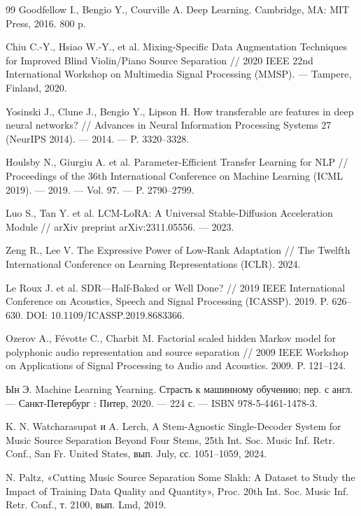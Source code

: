 \documentclass[14pt]{extarticle}
\begin{document}
\begin{thebibliography}{99}
	Goodfellow I., Bengio Y., Courville A. Deep Learning. Cambridge, MA: MIT Press, 2016. 800 p.

	Chiu C.-Y., Hsiao W.-Y., et al. Mixing-Specific Data Augmentation Techniques for Improved Blind Violin/Piano Source Separation // 2020 IEEE 22nd International Workshop on Multimedia Signal Processing (MMSP). — Tampere, Finland, 2020.

	Yosinski J., Clune J., Bengio Y., Lipson H. How transferable are features in deep neural networks? // Advances in Neural Information Processing Systems 27 (NeurIPS 2014). — 2014. — P. 3320–3328.

	Houlsby N., Giurgiu A. et al. Parameter-Efficient Transfer Learning for NLP // Proceedings of the 36th International Conference on Machine Learning (ICML 2019). — 2019. — Vol. 97. — P. 2790–2799.

	Luo S., Tan Y. et al. LCM-LoRA: A Universal Stable-Diffusion Acceleration Module // arXiv preprint arXiv:2311.05556. — 2023.

	Zeng R., Lee V. The Expressive Power of Low-Rank Adaptation // The Twelfth International Conference on Learning Representations (ICLR). 2024.

	Le Roux J. et al. SDR—Half-Baked or Well Done? // 2019 IEEE International Conference on Acoustics, Speech and Signal Processing (ICASSP). 2019. P. 626–630. DOI: 10.1109/ICASSP.2019.8683366.

	Ozerov A., Févotte C., Charbit M. Factorial scaled hidden Markov model for polyphonic audio representation and source separation // 2009 IEEE Workshop on Applications of Signal Processing to Audio and Acoustics. 2009. P. 121–124.

	Ын Э. Machine Learning Yearning. Страсть к машинному обучению; пер. с англ. — Санкт-Петербург : Питер, 2020. — 224 с. — ISBN 978-5-4461-1478-3.

	K. N. Watcharasupat и A. Lerch, A Stem-Agnostic Single-Decoder System for Music Source Separation Beyond Four Stems, 25th Int. Soc. Music Inf. Retr. Conf., San Fr. United States, вып. July, сс. 1051–1059, 2024.

	N. Paltz, «Cutting Music Source Separation Some Slakh: A Dataset to Study the Impact of Training Data Quality and Quantity», Proc. 20th Int. Soc. Music Inf. Retr. Conf., т. 2100, вып. Lmd, 2019.
\end{thebibliography}
\newpage
\end{document}
